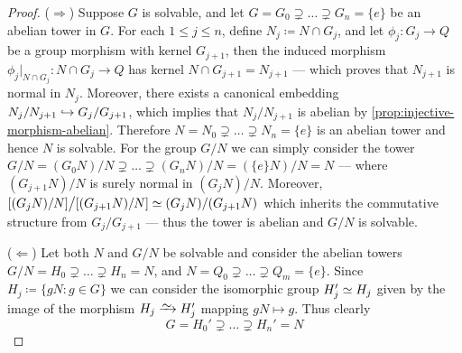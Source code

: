 \begin{proof}
(\(\Rightarrow\)) Suppose \(G\) is solvable, and let \(G = G_0 \supsetneq \dots
\supsetneq G_n = \{e\}\) be an abelian tower in \(G\).  For each \(1 \leq j \leq
n\), define \(N_{j} \coloneq N \cap G_j\), and let \(\phi_j: G_j \to Q\) be a
group morphism with kernel \(G_{j+1}\), then the induced morphism \(\phi_j|_{N
\cap G_j}: N \cap G_j \to Q\) has kernel \(N \cap G_{j+1} = N_{j+1}\) --- which
proves that \(N_{j+1}\) is normal in \(N_j\). Moreover, there exists a canonical
embedding \(N_j/N_{j+1} \hookrightarrow G_j/G_{j+1}\), which implies that \(N_j/N_{j+1}\)
is abelian by \cref{prop:injective-morphism-abelian}. Therefore \(N = N_0
\supsetneq \dots \supsetneq N_n = \{e\}\) is an abelian tower and hence \(N\) is
solvable. For the group \(G/N\) we can simply consider the tower \(G/N = (G_0
N)/N \supsetneq \dots \supsetneq (G_n N)/N = (\{e\} N)/N = N\) --- where
\((G_{j+1} N)/N\) is surely normal in \((G_j N)/N\). Moreover, \([(G_j N)/N]
\big/ [(G_{j+1} N)/N] \simeq (G_j N)/(G_{j+1} N)\) which inherits the commutative
structure from \(G_j/G_{j+1}\) --- thus the tower is abelian and \(G/N\) is
solvable.

(\(\Leftarrow\)) Let both \(N\) and \(G/N\) be solvable and consider the abelian
towers \(G/N = H_0 \supsetneq \dots \supsetneq H_n = N\), and \(N = Q_0
\supsetneq \dots \supsetneq Q_m = \{e\}\). Since \(H_j \coloneq \{g N : g \in
G\}\) we can consider the isomorphic group \(H_j' \simeq H_j\) given by the image
of the morphism \(H_{j} \isoto H_j'\) mapping \(g N \mapsto g\). Thus clearly
\[
  G = H_0' \supsetneq \dots \supsetneq H_n' = N
\]
\end{proof}

